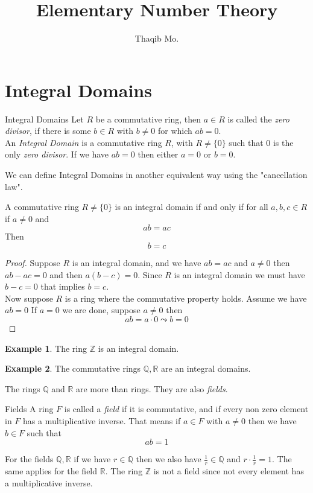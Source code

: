 \documentclass[16pt,a4paper]{article}
\author{Thaqib Mo.}
\title{ Elementary Number Theory }
\theoremstyle{definition}
\newtheorem{example}{Example}
\begin{document}
\maketitle
\newpage
\section{Integral Domains}
\begin{defn}{Integral Domains}{}
Let $R$ be a commutative ring, then $a\in R$ is called the \emph{zero divisor}, if there is some $b\in R$ with $b\neq 0$ for which $ab=0$.  
\\
An \emph{Integral Domain} is a commutative ring $R$, with $R\neq \{0\}$ such that $0$ is the only \emph{zero divisor}. If we have $ab=0$ then either $a=0$ or  $b=0$. 
\end{defn}

We can define Integral Domains in another equivalent way using the "cancellation law". 
\begin{thm}{}{}
A commutative ring $R\neq \{0\}$ is an integral domain if and only if for all $a,b,c \in R$ if $a\neq 0$ and 
\[ab=ac\]
Then
\[b=c\] 
\end{thm} 
\begin{proof}
Suppose $R$ is an integral domain, and we have $ab=ac$ and $a\neq 0$ then $ab-ac = 0$ and then $a(b-c) = 0$. Since $R$ is an integral domain we must have $b-c = 0$ that implies $b=c$. 
\\
Now suppose $R$ is a ring where the commutative property holds. Assume we have $ab=0$ If $a=0$ we are done, suppose $a\neq 0$ then 
\[ab=a\cdot 0 \leadsto b=0\]   
\end{proof}

\begin{example}
The ring $\mathbb{Z}$ is an integral domain.  
\end{example}

\begin{example}
The commutative rings $\mathbb{Q}, \mathbb{R}$ are an integral domains.  
\end{example}

The rings $\mathbb{Q}$ and $\mathbb{R}$ are more than rings. They are also \emph{fields}. 
\begin{defn}{Fields}{}
A ring $F$ is called a \emph{field} if it is commutative, and if every non zero element in $F$ has a multiplicative inverse. That means if $a\in F$ with $a\neq 0$ then we have $b\in F$ such that 
\[ab=1\]  
\end{defn}
For the fields $\mathbb{Q,R}$ if we have $r\in \mathbb{Q}$ then we also have $\frac{1}{r}\in \mathbb{Q}$ and $r\cdot \frac{1}{r} = 1$. The same applies for the field $\mathbb{R}$. The ring $\mathbb{Z}$ is not a field since not every element has a multiplicative inverse. 
\end{document}
